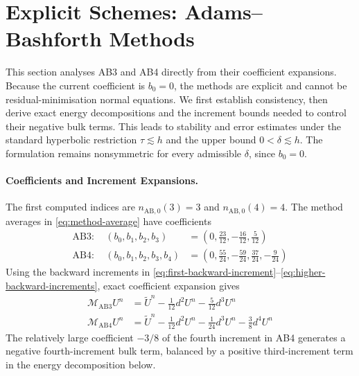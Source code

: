 \documentclass[11pt]{article}
\begin{document}

\section{Explicit Schemes: Adams--Bashforth Methods}
\label{sec:ab}
This section analyses AB3 and AB4 directly from their coefficient expansions.
Because the current coefficient is \(b_0=0\), the methods are explicit and
cannot be residual-minimisation normal equations. We first establish
consistency, then derive exact energy decompositions and the increment bounds
needed to control their negative bulk terms. This leads to stability and error
estimates under the standard hyperbolic restriction \(\tau\lesssim h\) and the
upper bound \(0<\delta\lesssim h\). The formulation remains nonsymmetric for
every admissible \(\delta\), since \(b_0=0\).

\paragraph{Coefficients and Increment Expansions.}
The first computed indices are \(n_{\mathrm{AB},0}(3)=3\) and
\(n_{\mathrm{AB},0}(4)=4\). The method
averages in \eqref{eq:method-average} have coefficients
\begin{align}
\mathrm{AB3}:\quad(b_0,b_1,b_2,b_3)
&=\left(0,\frac{23}{12},-\frac{16}{12},\frac5{12}\right) \label{eq:ab3-coefficients}\\
\mathrm{AB4}:\quad(b_0,b_1,b_2,b_3,b_4)
&=\left(0,\frac{55}{24},-\frac{59}{24},
\frac{37}{24},-\frac9{24}\right) \label{eq:ab4-coefficients}
\end{align}
Using the backward increments in
\eqref{eq:first-backward-increment}--\eqref{eq:higher-backward-increments},
exact coefficient expansion gives
\begin{align}
\mathcal M_{\mathrm{AB3}}U^n
&=\widetilde U^n-\frac1{12}d^2U^n-\frac5{12}d^3U^n \label{eq:ab3-increment-average}\\
\mathcal M_{\mathrm{AB4}}U^n
&=\widetilde U^n-\frac1{12}d^2U^n-\frac1{24}d^3U^n
-\frac38d^4U^n \label{eq:ab4-increment-average}
\end{align}
The relatively large coefficient \(-3/8\) of the fourth increment in AB4
generates a negative fourth-increment bulk term, balanced by a positive
third-increment term in the energy decomposition below.

\end{document}
